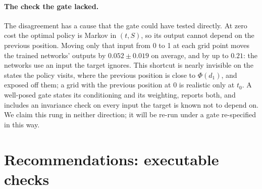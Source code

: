 \documentclass{article}
\begin{document}
\paragraph{The check the gate lacked.} The disagreement has a cause that the gate could have
tested directly. At zero cost the optimal policy is Markov in $(t, S)$, so its output cannot depend
on the previous position. Moving only that input from 0 to 1 at each grid point moves the trained
networks' outputs by $0.052 \pm 0.019$ on average, and by up to $0.21$: the networks use an input
the target ignores. This shortcut is nearly invisible on the states the policy visits, where the
previous position is close to $\Phi(d_1)$, and exposed off them; a grid with the previous position
at 0 is realistic only at $t_0$. A well-posed gate states its conditioning and its weighting,
reports both, and includes an invariance check on every input the target is known not to depend
on. We claim this rung in neither direction; it will be re-run under a gate re-specified in this
way.

\section{Recommendations: executable checks}\label{sec:recs}
\end{document}
